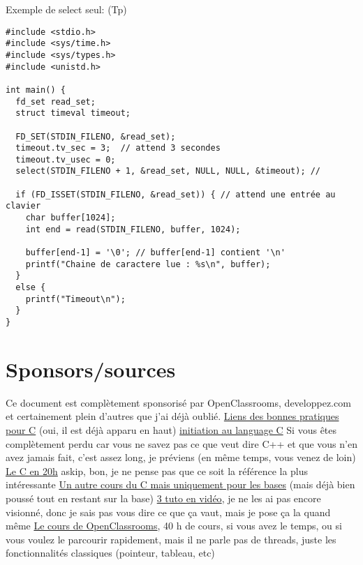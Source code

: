\documentclass[a4paper]{article}
\begin{document}
Exemple de select seul: (Tp)
\begin{lstlisting}
#include <stdio.h>
#include <sys/time.h>
#include <sys/types.h>
#include <unistd.h>

int main() {
  fd_set read_set; 
  struct timeval timeout;

  FD_SET(STDIN_FILENO, &read_set);
  timeout.tv_sec = 3;  // attend 3 secondes
  timeout.tv_usec = 0;  
  select(STDIN_FILENO + 1, &read_set, NULL, NULL, &timeout); //

  if (FD_ISSET(STDIN_FILENO, &read_set)) { // attend une entrée au clavier
    char buffer[1024];
    int end = read(STDIN_FILENO, buffer, 1024);

    buffer[end-1] = '\0'; // buffer[end-1] contient '\n'
    printf("Chaine de caractere lue : %s\n", buffer);
  }
  else {
    printf("Timeout\n");
  }
}
\end{lstlisting}
\section{Sponsors/sources}
Ce document est complètement sponsorisé par OpenClassrooms, developpez.com et certainement plein d'autres que j'ai déjà oublié.\newline
\href{http://emmanuel-delahaye.developpez.com/tutoriels/c/bonnes-pratiques-codage-c/#LI-A}{Liens des bonnes pratiques pour C} (oui, il est déjà apparu en haut)\newline
\href{http://melem.developpez.com/tutoriels/langage-c/initiation-langage-c/}{initiation au language C} Si vous êtes complètement perdu car vous ne savez pas ce que veut dire C++ et que vous n'en avez jamais fait, c'est assez long, je préviens (en même temps, vous venez de loin)\newline
\href{https://c.developpez.com/cours/20-heures/}{Le C en 20h} askip, bon, je ne pense pas que ce soit la référence la plus intéressante\newline
\href{https://c.developpez.com/cours/poly-c/?page=page_1}{Un autre cours du C mais uniquement pour les bases} (mais déjà bien poussé tout en restant sur la base)\newline
\href{https://fr.tuto.com/langage-c/}{3 tuto en vidéo}, je ne les ai pas encore visionné, donc je sais pas vous dire ce que ça vaut, mais je pose ça la quand même\newline
\href{https://openclassrooms.com/courses/apprenez-a-programmer-en-c}{Le cours de OpenClassrooms}, 40 h de cours, si vous avez le temps, ou si vous voulez le parcourir rapidement, mais il ne parle pas de threads, juste les fonctionnalités classiques (pointeur, tableau, etc)
\end{document}
